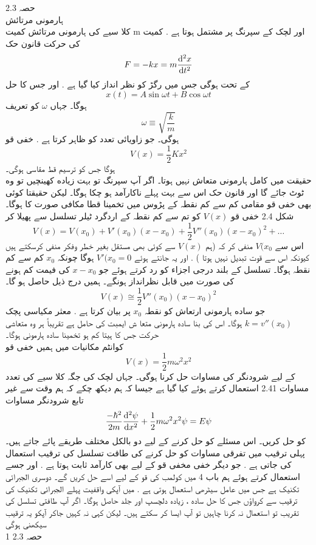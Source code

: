 \documentclass{book}
\begin{document}
حصہ
2.3\\
ہارمونی مرتائش\\
کلا سیے کی ہارمونی مرتائش کمیت
m
اور لچک کے سپرنگ پر مشتمل ہوتا ہے . کمیت کی حرکت قانون حک 
\[F=-kx=m\frac{\dif{^{2}x}}{\dif{t^{2}}}\]
کے تحت ہوگی جس میں رگڑ کو نظر انداز کیا گیا ہے . اور جس کا حل
\[x(t)=A\sin{\omega t}+B\cos{\omega t}\]
ہوگا۔ جہاں
\(\omega\)
کو تعریف 
\[\omega\equiv \sqrt{\frac{k}{m}}\]
ہوگی۔ جو زاویائی تعدد کو ظاہر کرتا ہے . خفی قو
\[V(x)=\frac{1}{2}Kx^{2}\]
ہوگا جس کو ترسیم قط مقاسی ہوگی۔ \\
حقیقت میں کامل ہارمونی متعاش نہیں ہوتا۔ اگر آپ سپرنگ تو بہت زیاده کھینچیں تو وه ٹوٹ جائے گا اور قانون حک اس سے بہت پہلے ناکارآمد ہو چکا ہوگا۔ لیکن حقيقتا کوئی بھی خفی قو مقامی کم سے کم نقطہ کے پڑوس میں تخمينا قطا مکافی صورت کا ہوگا۔ شکل
2.4
خفی قو
\(V(x)\)
کو تم سے کم نقطہ کے اردگرد ٹیلر تسلسل سے پھیلا کر
\[V(x)=V( x_{0})+V'(x_{0})(x-x_{0})+\frac{1}{2}V''(x_{0})(x-x_{0})^{2}+\dotsc\]
اس سے
\(V(x_{0}\)
منفی کر کہ (ہم
\(V(x)\)
سے کوئی بھی مستقل بغیر خطر وفکر منفی کرسکتے ہیں کیونکہ اس سے قوت تبدیل نہیں ہوتا ) . اور یہ جانتے ہوئے
\(V'(x_{0}=0\)
ہوگا چونکہ
\(x_{0}\)
کم سے کم نقطہ ہوگا۔ تسلسل کے بلند درجی اجزاء کو رد کرتے ہوئے جو
\(x-x_{0}\)
کی فیمت کم ہونے کی صورت میں قابل نظرانداز ہونگے۔ ہمیں درج ذیل حاصل ہو گا۔\\
\[V(x)\cong\frac{1}{2}V''(x_{0})(x-x_{0})^{2}\]
جو ساده ہارمونی ارتعاش کو نقطہ
\( x_{0}\)
پر بیان کرتا ہے .
معثر مکیاسی پچک
\(k=v''(x_{0})\)
ہوگا۔ اس کی بنا ساده ہارمونی متعا ش ایمبت کی حامل ہے 
تقریباً ہر وہ متعاشی حرکت جس کا ہیتا کم ہو تخمینا سادہ ہارمونی ہوگا۔\\
کوانٹم مکانیات میں ہمیں خفی قو
\[V(x)=\frac{1}{2}m\omega ^{2}x^{2}\]
کے لیے شرودنگر کی مساوات حل کرنا ہوگی۔ جہاں لچک کی جگہ کلا سیے کی تعدد مساوات 
2.41
استعمال کرتے ہوئے کیا گیا ہے جیسا کہ ہم دیکھ چکے کہ ہم وقت سے غیر تابع شرودنگر مساوات
\[\frac{-\hbar ^{2}}{2m}\frac{\dif{^{2}\psi}}{\dif{x^{2}}}+\frac{1}{2}m\omega ^{2}x^{2}\psi=E\psi\]
کو حل کریں۔ اس مسئلے کو حل کرنے کے لیے دو بالکل مختلف طریقے پائے جاتے ہیں۔ پہلی ترقیب میں تفرقی مساوات کو حل کرنے کی طاقت تسلسل کی ترقیب استعمال کی جاتی ہے . جو دیگر خفی مخفی قو کے لیے بھی کارآمد ثابت ہوتا ہے . اور جسے استعمال کرتے ہوئے ہم باب 4
میں کولمب کی قو کے لیے اسے حل کریں گے۔ دوسری الجبرائی تکنیک ہے جس میں عامل سیٹرھی استعمال ہوتی ہے . میں آپکی واقفیت پہلے الجبرائی تکنیک کی ترقیب سے کرواؤں جس کا حل ساده ، زیادہ دلچسپ اور جلد حاصل ہوگا۔ اگر آپ طافتی تسلسل کی تقریب تو استعمال نہ کرنا چاہیں تو آپ ایسا کر سکتے ہیں۔ لیکن کہی نہ کہیں جاکر آپکو یہ ترقیب سیکھنی ہوگی \\
حصہ
2.3 1\\
\end{document}
